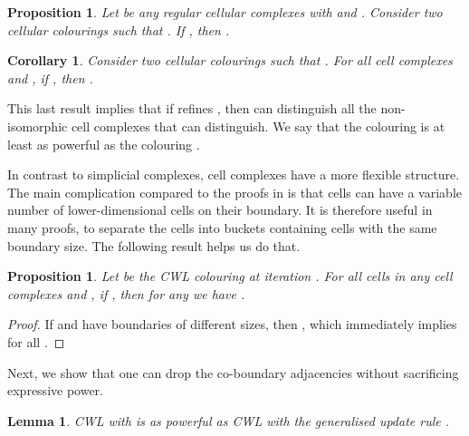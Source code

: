 \documentclass{article}
\newtheorem{proposition}[theorem]{Proposition}
\newtheorem{lemma}[theorem]{Lemma}
\newtheorem{corollary}[theorem]{Corollary}
\begin{document}
\begin{proposition}
\label{prop:refine_multiset}
Let  be any regular cellular complexes with  and . Consider two cellular colourings  such that . If , then .
\end{proposition}

\begin{corollary}
\label{cor:non_iso_colour}
Consider two cellular colourings  such that . For all cell complexes  and , if , then . 
\end{corollary}

This last result implies that if  refines , then  can distinguish all the non-isomorphic cell complexes that  can distinguish. We say that the colouring  is at least as powerful as the colouring . 

In contrast to simplicial complexes, cell complexes have a more flexible structure. The main complication compared to the proofs in \citet{bodnar2021weisfeiler} is that cells can have a variable number of lower-dimensional cells on their boundary. It is therefore useful in many proofs, to separate the cells into buckets containing cells with the same boundary size. The following result helps us do that. 

\begin{proposition}
\label{prop:cwl_face_id}
Let  be the CWL colouring at iteration . For all cells  in any cell complexes  and , if , then for any  we have .  
\end{proposition}

\begin{proof}
If  and  have boundaries of different sizes, then , which immediately implies  for all . 
\end{proof}

Next, we show that one can drop the co-boundary adjacencies without sacrificing expressive power.

\begin{lemma}
\label{lemma:drop_cofaces}
    CWL with  is as powerful as CWL with the generalised update rule .
\end{lemma}
\end{document}
